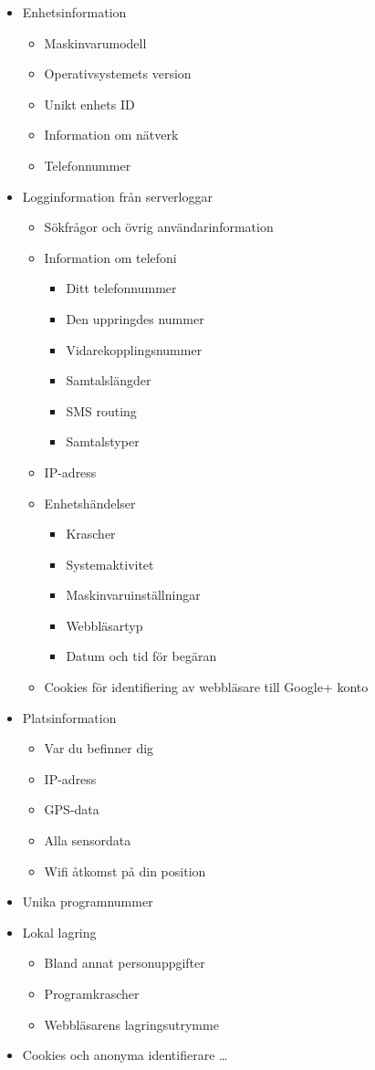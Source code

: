 \documentclass[a4paper,11pt]{article}
\begin{document}
{\begin{itemize}
 \item Enhetsinformation
 \begin{itemize}
   \item Maskinvarumodell
   \item Operativsystemets version 
   \item Unikt enhets ID
   \item Information om nätverk
   \item Telefonnummer
 \end{itemize}
 \item Logginformation från serverloggar
 \begin{itemize}
     \item Sökfrågor och övrig användarinformation
     \item Information om telefoni
     \begin{itemize}
       \item Ditt telefonnummer
      \item Den uppringdes nummer
      \item Vidarekopplingsnummer
      \item Samtalslängder
      \item SMS routing
      \item Samtalstyper
     \end{itemize}
     \item IP-adress
     \item Enhetshändelser
    \begin{itemize}
      \item Krascher
      \item Systemaktivitet
      \item Maskinvaruinställningar
      \item Webbläsartyp
      \item Datum och tid för begäran    
    \end{itemize}
    \item Cookies för identifiering av webbläsare till Google+ konto
 \end{itemize}
 \item Platsinformation
 \begin{itemize}
    \item Var du befinner dig
    \item IP-adress
    \item GPS-data
    \item Alla sensordata
    \item Wifi åtkomst på din position 
 \end{itemize}
 \item Unika programnummer
 \item Lokal lagring
 \begin{itemize}
    \item Bland annat personuppgifter
    \item Programkrascher
    \item Webbläsarens lagringsutrymme 
 \end{itemize}   
 \item Cookies och anonyma identifierare \ldots
\end{itemize}

}
\end{document}
